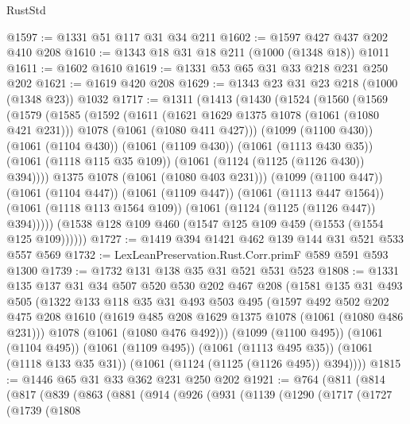 \begin{lexlean}{RustStd}
\begin{coremodule}
@1597 := @1331 @51 @117 @31 @34 @211
@1602 := @1597 @427 @437 @202 @410 @208
@1610 := @1343 @18 @31 @18 @211 (@1000 (@1348 @18)) @1011
@1611 := @1602 @1610
@1619 := @1331 @53 @65 @31 @33 @218 @231 @250 @202
@1621 := @1619 @420 @208
@1629 := @1343 @23 @31 @23 @218 (@1000 (@1348 @23)) @1032
@1717 := @1311
    (@1413
      (@1430
        (@1524
          (@1560
            (@1569
              (@1579
                (@1585
                  (@1592
                    (@1611
                      (@1621 @1629 @1375 @1078 (@1061 (@1080 @421 @231)))
                      @1078
                      (@1061 (@1080 @411 @427)))
                    (@1099 (@1100 @430))
                    (@1061 (@1104 @430))
                    (@1061 (@1109 @430))
                    (@1061 (@1113 @430 @35))
                    (@1061 (@1118 @115 @35 @109))
                    (@1061 (@1124 (@1125 (@1126 @430)) @394))))
                @1375
                @1078
                (@1061 (@1080 @403 @231)))
              (@1099 (@1100 @447))
              (@1061 (@1104 @447))
              (@1061 (@1109 @447))
              (@1061 (@1113 @447 @1564))
              (@1061 (@1118 @113 @1564 @109))
              (@1061 (@1124 (@1125 (@1126 @447)) @394)))))
        (@1538 @128 @109 @460 (@1547 @125 @109 @459 (@1553 (@1554 @125 @109))))))
@1727 := @1419 @394 @1421 @462 @139 @144 @31 @521 @533 @557 @569
@1732 := LexLeanPreservation.Rust.Corr.primF @589 @591 @593 @1300
@1739 := @1732 @131 @138 @35 @31 @521 @531 @523
@1808 := @1331
    @135
    @137
    @31
    @34
    @507
    @520
    @530
    @202
    @467
    @208
    (@1581
      @135
      @31
      @493
      @505
      (@1322
        @133
        @118
        @35
        @31
        @493
        @503
        @495
        (@1597
          @492
          @502
          @202
          @475
          @208
          @1610
          (@1619 @485 @208 @1629 @1375 @1078 (@1061 (@1080 @486 @231)))
          @1078
          (@1061 (@1080 @476 @492)))
        (@1099 (@1100 @495))
        (@1061 (@1104 @495))
        (@1061 (@1109 @495))
        (@1061 (@1113 @495 @35))
        (@1061 (@1118 @133 @35 @31))
        (@1061 (@1124 (@1125 (@1126 @495)) @394))))
@1815 := @1446 @65 @31 @33 @362 @231 @250 @202
@1921 := @764
    (@811
      (@814
        (@817
          (@839
            (@863
              (@881
                (@914
                  (@926
                    (@931
                      (@1139
                        (@1290
                          (@1717
                            (@1727
                              (@1739
                                (@1808

\end{coremodule}
\end{lexlean}
